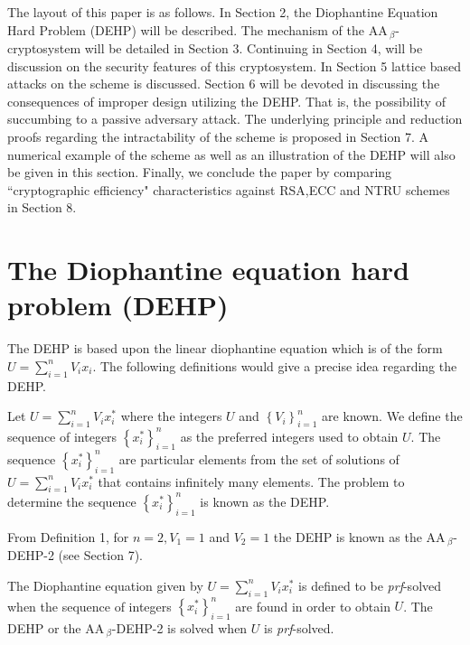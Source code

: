 \documentclass{llncs}
\begin{document}
The layout of this paper is as follows. In Section 2, the
Diophantine Equation Hard Problem (DEHP) will be described. The
mechanism of the AA\,$_{\beta}$-cryptosystem will be detailed in
Section 3. Continuing in Section 4, will be discussion on the
security features of this cryptosystem. In Section 5 lattice based
attacks on the scheme is discussed. Section 6 will be devoted in
discussing the consequences of improper design utilizing the DEHP.
That is, the possibility of succumbing to a passive adversary
attack. The underlying principle and reduction proofs regarding
the intractability of the scheme is proposed in Section 7. A
numerical example of the scheme as well as an illustration of the
DEHP will also be given in this section. Finally, we conclude the
paper by comparing ``cryptographic efficiency" characteristics
against RSA,ECC and NTRU schemes in Section 8.

\section{The Diophantine equation hard problem (DEHP)}
The DEHP is based upon the linear diophantine equation which is of
the form $U=\sum\limits_{i=1}^n {V_i x_{i}}$. The following
definitions would give a precise idea regarding the DEHP.

\begin{definition}
Let $U=\sum\limits_{i=1}^n {V_i x_{i}^{*}}$ where the integers $U$
and $\left\{ {V_i } \right\}_{i = 1}^n $ are known. We define the
sequence of integers $ \left\{ {x_{i}^{*}}\right\}_{i = 1}^n $ as
the preferred integers used to obtain $U$. The sequence $ \left\{
{x_{i}^{*}}\right\}_{i = 1}^n $ are particular elements from the
set of solutions of $U=\sum\limits_{i=1}^n {V_i x_{i}^{*}}$ that
contains infinitely many elements. The problem to determine the
sequence $ \left\{ {x_{i}^{*}}\right\}_{i = 1}^n $ is known as the
DEHP.
\end{definition}

\begin{definition}
From Definition 1, for $n=2, V_{1}=1$ and $V_{2}=1$ the DEHP is
known as the AA\,$_{\beta}$-DEHP-2 (see Section 7).
\end{definition}

\begin{definition}
The Diophantine equation given by $U=\sum\limits_{i=1}^n {V_i
x_{i}^{*}}$ is defined to be \textit{prf}-solved when the sequence
of integers $ \left\{ {x_{i}^{*}}\right\}_{i = 1}^n $ are found in
order to obtain $U$. The DEHP or the AA\,$_{\beta}$-DEHP-2 is
solved when $U$ is \textit{prf}-solved.
\end{definition}
\end{document}
